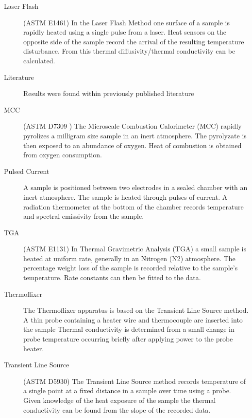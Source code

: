 \begin{description}
\item[Laser Flash] (ASTM E1461) In the Laser Flash Method one surface of a sample is rapidly heated using a single pulse from a laser. Heat sensors on the opposite side of the sample record the arrival of the resulting temperature disturbance. From this thermal diffusivity/thermal conductivity can be calculated.
\item[Literature] Results were found within previously published literature
\item[MCC] (ASTM D7309 ) The Microscale Combustion Calorimeter (MCC)  rapidly pyrolizes a milligram size sample in an inert atmosphere. The pyrolyzate is then exposed to an abundance of oxygen.  Heat of combustion is obtained from oxygen consumption.
\item[Pulsed Current] A sample is positioned between two electrodes in a sealed chamber with an inert atmosphere. The sample is heated through pulses of current. A radiation thermometer at the bottom of the chamber records temperature and spectral emissivity from the sample.
\item[TGA] (ASTM E1131) In Thermal Gravimetric Analysis (TGA)  a small sample is heated at uniform rate, generally in an Nitrogen (N2) atmosphere. The percentage weight loss of the sample is recorded relative to the sample’s temperature. Rate constants can then be fitted to the data.
\item[Thermoflixer] The Thermoflixer apparatus is based on the Transient Line Source method. A thin probe containing a heater wire and thermocouple are inserted into the sample Thermal conductivity is determined from a small change in probe temperature occurring briefly after applying power to the probe heater.
\item[Transient Line Source] (ASTM D5930) The Transient Line Source method records temperature of a single point at a fixed distance in a sample over time using a probe. Given knowledge of the heat exposure of the sample the thermal conductivity can be found from the slope of the recorded data.
\end{description}

